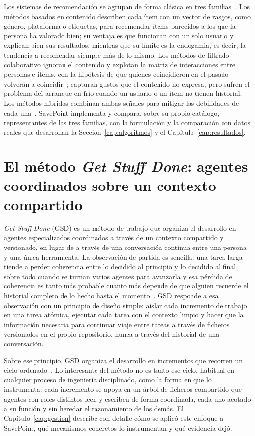 Los sistemas de recomendación se agrupan de forma clásica en tres familias~\cite{ricci2022handbook,
aggarwal2016recommender}. Los métodos basados en contenido describen cada ítem con un vector
de rasgos, como género, plataforma o etiquetas, para recomendar ítems parecidos a los que la
persona ha valorado bien; su ventaja es que funcionan con un solo usuario y explican bien sus
resultados, mientras que su límite es la endogamia, es decir, la tendencia a recomendar
siempre más de lo mismo. Los métodos de filtrado colaborativo ignoran el contenido y explotan
la matriz de interacciones entre personas e ítems, con la hipótesis de que quienes
coincidieron en el pasado volverán a coincidir~\cite{adomavicius2005toward}; capturan gustos
que el contenido no expresa, pero sufren el problema del arranque en frío cuando un usuario o
un ítem no tienen historial. Los métodos híbridos combinan ambas señales para mitigar las
debilidades de cada una~\cite{burke2002hybrid}. SavePoint implementa y compara, sobre su propio
catálogo, representantes de las tres familias, con la formulación y la comparación con datos
reales que desarrollan la Sección~\ref{cap:algoritmos} y el Capítulo~\ref{cap:resultados}.

\section{El método \textit{Get Stuff Done}: agentes coordinados sobre un contexto compartido}\label{sec:arte-agentes}

\textit{Get Stuff Done} (GSD) es un método de trabajo que organiza el desarrollo en agentes
especializados coordinados a través de un contexto compartido y versionado, en lugar de a
través de una conversación continua entre una persona y una única herramienta. La observación
de partida es sencilla: una tarea larga tiende a perder coherencia entre lo decidido al
principio y lo decidido al final, sobre todo cuando se turnan varios agentes para avanzarla y
esa pérdida de coherencia es tanto más probable cuanto más depende de que alguien recuerde el
historial completo de lo hecho hasta el momento~\cite{anthropic-context}. GSD responde a esa
observación con un principio de diseño simple: aislar cada incremento de trabajo en una tarea
atómica, ejecutar cada tarea con el contexto limpio y hacer que la información necesaria para
continuar viaje entre tareas a través de ficheros versionados en el propio repositorio, nunca a
través del historial de una conversación.

Sobre ese principio, GSD organiza el desarrollo en incrementos que recorren un ciclo ordenado~\cite{gsd}. Lo interesante del método no
es tanto ese ciclo, habitual en cualquier proceso de ingeniería disciplinado, como la forma en
que lo instrumenta: cada incremento se apoya en un árbol de ficheros compartido que agentes con
roles distintos leen y escriben de forma coordinada, cada uno acotado a su función
y sin heredar el razonamiento de los demás. El
Capítulo~\ref{cap:gestion} describe con detalle cómo se aplicó este enfoque a SavePoint, qué
mecanismos concretos lo instrumentan y qué evidencia dejó.
